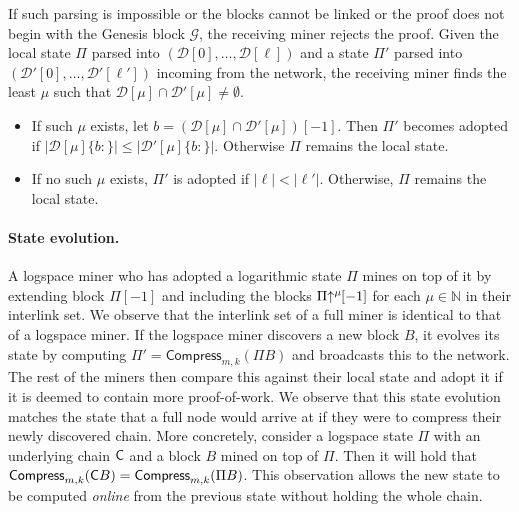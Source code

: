 If such parsing is impossible or the blocks cannot be
linked or the proof
does not begin with the Genesis block $\mathcal{G}$, the
receiving miner rejects the proof.
Given the local state $\Pi$ parsed into $(\mathcal{D}[0],\dots,\mathcal{D}[\ell])$ and a state
$\Pi'$ parsed into $(\mathcal{D}'[0],\dots,\mathcal{D}'[\ell'])$ incoming from the network, the receiving miner finds the
least $\mu$ such that $\mathcal{D}[\mu]\cap\mathcal{D}'[\mu]\ne\emptyset$.
\begin{itemize}
	\item
		If such $\mu$ exists, let $b = (\mathcal{D}[\mu] \cap \mathcal{D}'[\mu])[-1]$. Then
		$\Pi'$ becomes adopted if $|\mathcal{D}[\mu]\{b{:}\}| \leq |\mathcal{D}'[\mu]\{b:\}|$.
		Otherwise $\Pi$ remains the local state.
	\item
		If no such $\mu$ exists, $\Pi'$ is adopted if $|\ell| < |\ell'|$. Otherwise,
		$\Pi$ remains the local state.
\end{itemize}

\paragraph{State evolution.}
A logspace miner who has adopted a logarithmic state $\Pi$ mines on top of it
by extending block $\Pi[-1]$ and including the blocks $\Pi\negthickspace\uparrow^\mu\!\![-1]$ for
each $\mu \in \mathbb{N}$ in their interlink set. We observe that the interlink set of a
full miner is identical to that of a logspace miner. If the logspace miner discovers
a new block $B$, it evolves its state by computing
$\Pi' = \textsf{Compress}_{m,k}(\Pi B)$ and broadcasts this to the network. The
rest of the miners then compare this against their local state and adopt it if
it is deemed to contain more proof-of-work. We observe that this state evolution
matches the state that a full node would arrive at if they were to compress
their newly discovered chain. More concretely, consider a logspace state $\Pi$
with an underlying chain $\mathsf{C}$ and a block $B$ mined on top of $\Pi$. Then
it will hold that
$\textsf{Compress}_{m,k}(\mathsf{C} B) = \textsf{Compress}_{m,k}(\Pi B)$. This
observation allows the new state to be computed \emph{online} from the previous
state without holding the whole chain.

